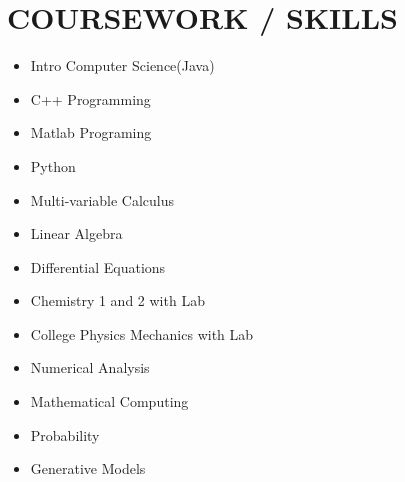 \documentclass[letterpaper,11pt]{article}
\begin{document}
\section{COURSEWORK / SKILLS}
        \begin{multicols}{4}
            \begin{itemize}[itemsep=-2pt, parsep=5pt]
               \item Intro Computer Science(Java)
                \item C++ Programming
                \item Matlab Programing 
                \item Python 
                \item Multi-variable Calculus
                \item Linear Algebra 
                \item Differential Equations
                \item Chemistry 1 and 2 with Lab 
                \item College Physics Mechanics with Lab 
                \item Numerical Analysis
                \item Mathematical Computing 
                \item Probability  
                \item Generative Models 
            \end{itemize}
        \end{multicols}
        \vspace*{2.0\multicolsep}
\end{document}
